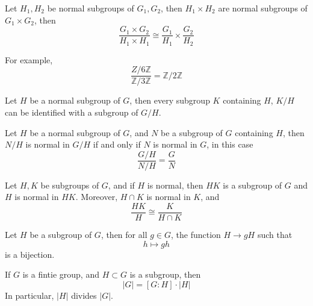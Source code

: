 \documentclass[openany]{book}
\newcommand{\Z}{\mathbb{Z}}
\begin{document}
\begin{prop}
    Let $H_1,H_2$ be normal subgroups of $G_1,G_2$, then $H_1\times H_2$ are normal subgroups of $G_1\times G_2$, then 
    \begin{equation*}
        \frac{G_1\times G_2}{H_1\times H_1}\cong\frac{G_1}{H_1}\times\frac{G_2}{H_2}
    \end{equation*}

    For example, 
    \begin{equation*}
        \frac{Z/6\Z}{\Z/3\Z}=\Z/2\Z
    \end{equation*}
\end{prop}

\begin{prop}
    Let $H$ be a normal subgroup of $G$, then every subgroup $K$ containing $H$, $K/H$ can be identified with a subgroup of $G/H$.
\end{prop}


\begin{prop}
    Let $H$ be a normal subgroup of $G$, and $N$ be a subgroup of $G$ containing $H$, then $N/H$ is normal in $G/H$ if and only if $N$ is normal in $G$, in this case
    \begin{equation*}
        \frac{G/H}{N/H}=\frac{G}{N}
    \end{equation*}
\end{prop}



\begin{prop}
    Let $H,K$ be subgroups of $G$, and if $H$ is normal, then $HK$ is a subgroup of $G$ and $H$ is normal in $HK$. Moreover, $H\cap K$ is normal in $K$, and 
    \begin{equation*}
        \frac{HK}{H}\cong\frac{K}{H\cap K}
    \end{equation*}
\end{prop}


\begin{prop}
    Let $H$ be a subgroup of $G$, then for all $g\in G$, the function $H\to gH$ such that
    \begin{equation*}
       h\mapsto gh
    \end{equation*}
    is a bijection.
\end{prop}

\begin{thm}[Lagrange]
    If $G$ is a fintie group, and $H\subset G$ is a subgroup, then 
    \begin{equation*}
        |G|=[G:H]\cdot|H|
    \end{equation*}
    In particular, $|H|$ divides $|G|$.
\end{thm}
\end{document}
